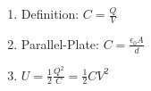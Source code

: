 

\vspace*{\fill}
\centering

\begin{enumerate}
    \item Definition: $\displaystyle C = \frac{Q}{V}$ 
    \item Parallel-Plate: $\displaystyle C = \frac{\epsilon_0 A}{d}$
    \item $\displaystyle U = \frac{1}{2}\frac{Q^2}{C} = \frac{1}{2}CV^2$
\end{enumerate}

\centering
\vspace*{\fill}


